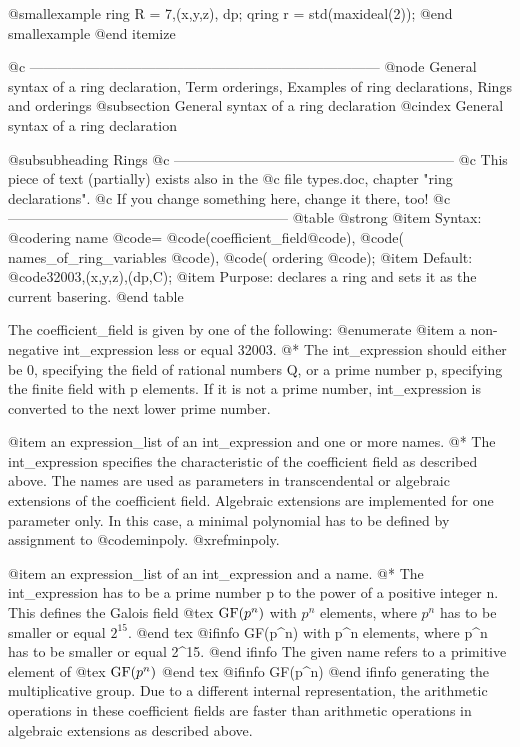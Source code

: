 @smallexample
ring R = 7,(x,y,z), dp;
qring r = std(maxideal(2));
@end smallexample
@end itemize

@c ---------------------------------------------------------------------------
@node General syntax of a ring declaration, Term orderings, Examples of ring declarations, Rings and orderings
@subsection General syntax of a ring declaration
@cindex General syntax of a ring declaration

@subsubheading Rings
@c ------------------------------------------------------------
@c   This piece of text (partially) exists also in the
@c   file types.doc, chapter "ring declarations".
@c   If you change something here, change it there, too!
@c ------------------------------------------------------------
@table @strong
@item Syntax:
@code{ring} name @code{=} @code{(}coefficient_field@code{),}
  @code{(} names_of_ring_variables @code{),}
  @code{(} ordering @code{);}
@item Default:
@code{32003,(x,y,z),(dp,C);}
@item Purpose:
declares a ring and sets it as the current basering.
@end table

The coefficient_field is given by one of the following:
@enumerate
@item
a non-negative int_expression less or equal 32003.
@* The int_expression should either be 0, specifying the field of
rational numbers Q, or a prime number p, specifying the finite field
with p elements.  If it is not a prime number, int_expression is
converted to the next lower prime number.

@item
an expression_list of an int_expression and one or more names.
@* The int_expression specifies the characteristic of the coefficient
field as described above. The names are used as parameters in
transcendental or algebraic extensions of the coefficient
field. Algebraic extensions are implemented for one parameter only. In
this case, a minimal polynomial has to be defined by assignment to
@code{minpoly}. @xref{minpoly}.

@item
an expression_list of an int_expression and a name.
@* The int_expression has to be a prime number p to the power of a
positive integer n. This defines the Galois field
@tex
$\hbox{GF}(p^n)$ with $p^n$ elements, where $p^n$ has to be smaller or equal $2^{15}$.
@end tex
@ifinfo
GF(p^n) with p^n elements, where p^n has to be smaller or equal 2^15.
@end ifinfo
The given name refers to a primitive element of
@tex
$\hbox{GF}(p^n)$
@end tex
@ifinfo
GF(p^n)
@end ifinfo
generating the multiplicative group.  Due to a different internal
representation, the arithmetic operations in these coefficient fields
are faster than arithmetic operations in algebraic extensions as
described above.

